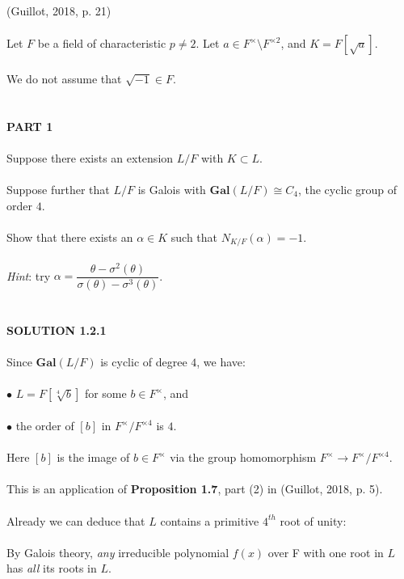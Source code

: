 \documentclass{article}
\begin{document}
  (Guillot, 2018, p. 21) \\\\
\indent Let $F$ be a field of characteristic $p \neq 2$. Let $a \in F^\times{\setminus}F^{\times2}$, and $K = F[\sqrt{a}]$. \\\\
\indent We do not assume that $\sqrt{-1} \in{F}$. \\\\
\\
\textbf{PART 1} \\\\
\indent Suppose there exists an extension $L/F$ with $K \subset L$. \\\\
\indent Suppose further that $L/F$ is Galois with $\textbf{Gal}(L/F) \cong C_4$, the cyclic group of order $4$. \\\\
\indent Show that there exists an $\alpha \in K$ such that $N_{K/F}(\alpha) = -1$. \\\\
\indent \emph{Hint}: try $\alpha = \dfrac{\theta - \sigma^2(\theta)}{\sigma(\theta) - \sigma^3(\theta)}$. \\\\
\\
\textbf{SOLUTION 1.2.1} \\\\
\noindent Since $\textbf{Gal}(L/F)$ is cyclic of degree $4$, we have: \\\\
\indent $\bullet$ \indent $L = F[\sqrt[4]{b}]$ for some $b \in{F^{\times}}$, and \\\\
\indent $\bullet$ \indent the order of $[b]$ in ${F^\times/F^{\times4}}$ is $4$. \\\\
Here $[b]$ is the image of $b \in{F^{\times}}$ via the group homomorphism $F^{\times} \rightarrow F^{\times}/F^{\times4}$. \\\\
This is an application of \textbf{Proposition 1.7}, part (2) in (Guillot, 2018, p. 5). \\\\
Already we can deduce that $L$ contains a primitive $4^{th}$ root of unity: \\\\
\indent By Galois theory, \emph{any} irreducible polynomial $f(x)$ over F with one root in $L$ has \emph{all} its roots in $L$. \\\\
\end{document}
